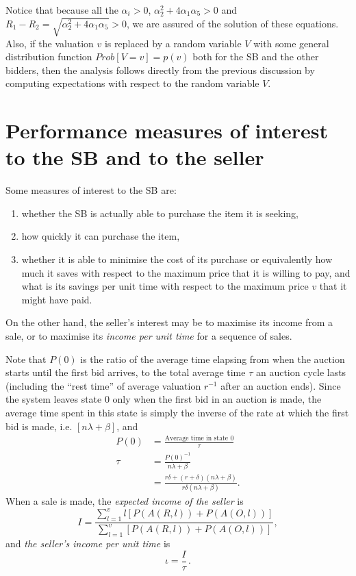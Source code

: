 \documentclass{comjnl}
\begin{document}
Notice that because all the $\alpha_i>0$,
$\alpha_2^2+4\alpha_1\alpha_5>0$ and
$R_1-R_2=\sqrt{\alpha_2^2+4\alpha_1\alpha_5}>0$, we are assured of
the solution of these equations. Also, if the valuation $v$ is
replaced by a random variable $V$ with some general distribution
function $Prob[V=v]=p(v)$ both for the SB and the other bidders,
then the analysis follows directly from the previous discussion by
computing expectations with respect to the random variable $V$.

\section{Performance measures of interest to the SB and to the seller}  \label{Performance}

Some measures of interest to the SB are:
\begin{enumerate}
\item \label{Perf1}whether the SB is actually able to purchase the
item it is seeking, \item \label{Perf2} how quickly it can
purchase the item, \item \label{Perf3} whether it is able to
minimise the cost of its purchase or equivalently how much it
saves with respect to the maximum price that it is willing to pay,
and what is its savings per unit time with respect to the maximum
price $v$ that it might have paid.
\end{enumerate}
On the other hand, the seller's interest may be to maximise its
income from a sale, or to maximise its {\em income per unit time}
for a sequence of sales.

Note that $P(0)$ is the ratio of the average time elapsing from
when the auction starts until the first bid arrives, to the total
average time $\tau$ an auction cycle lasts (including the ``rest
time'' of average valuation $r^{-1}$ after an auction ends). Since
the system leaves state $0$ only when the first bid in an auction
is made, the average time spent in this state is simply the
inverse of the rate at which the first bid is made, i.e.
$[n\lambda + \beta]$, and
\begin{align} \label{eq:FirstModel_P0Definition}
P(0)&=\frac{\text{Average time in state } 0}{\tau}  \\
\tau&=\frac{P(0)^{-1}}{n \lambda+\beta}\nonumber \\
&=\frac{r\delta+(r+\delta)(n\lambda+\beta)}{r\delta(n\lambda+\beta)}
\nonumber.
\end{align}
When a sale is made, the {\em expected income of the seller} is
\begin{equation}
I = \frac{ \sum_{l=1}^v l[P(A(R,l))+P(A(O,l))]}{ \sum_{l=1}^v
[P(A(R,l))+P(A(O,l))]} ,
\end{equation}
and {\em the seller's income per unit time} is
\begin{equation}
\iota = \frac{I}{\tau} \,.
\end{equation}
\end{document}
